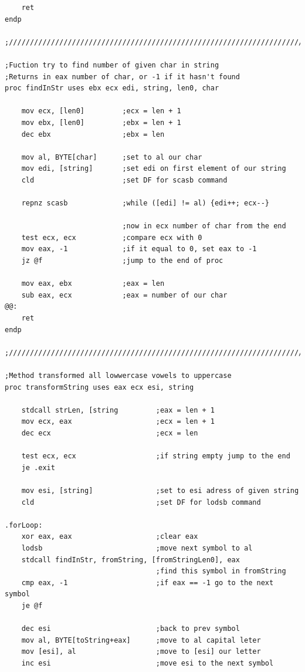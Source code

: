 \documentclass[14pt,a4paper]{article}
\begin{document}
\begin{verbatim}
    ret
endp

;///////////////////////////////////////////////////////////////////////

;Fuction try to find number of given char in string
;Returns in eax number of char, or -1 if it hasn't found
proc findInStr uses ebx ecx edi, string, len0, char

    mov ecx, [len0]         ;ecx = len + 1
    mov ebx, [len0]         ;ebx = len + 1
    dec ebx				    ;ebx = len

    mov al, BYTE[char]      ;set to al our char
    mov edi, [string]       ;set edi on first element of our string
    cld                     ;set DF for scasb command

    repnz scasb             ;while ([edi] != al) {edi++; ecx--}

                            ;now in ecx number of char from the end
    test ecx, ecx           ;compare ecx with 0			
    mov eax, -1             ;if it equal to 0, set eax to -1  
    jz @f                   ;jump to the end of proc

    mov eax, ebx            ;eax = len
    sub eax, ecx            ;eax = number of our char
@@:
    ret
endp

;///////////////////////////////////////////////////////////////////////

;Method transformed all lowwercase vowels to uppercase
proc transformString uses eax ecx esi, string

    stdcall strLen, [string         ;eax = len + 1
    mov ecx, eax                    ;ecx = len + 1
    dec ecx                         ;ecx = len

    test ecx, ecx                   ;if string empty jump to the end
    je .exit	

    mov esi, [string]               ;set to esi adress of given string
    cld                             ;set DF for lodsb command
	
.forLoop:	
    xor eax, eax                    ;clear eax	
    lodsb                           ;move next symbol to al 
    stdcall findInStr, fromString, [fromStringLen0], eax
                                    ;find this symbol in fromString
    cmp eax, -1                     ;if eax == -1 go to the next symbol
    je @f

    dec esi                         ;back to prev symbol
    mov al, BYTE[toString+eax]      ;move to al capital leter
    mov [esi], al                   ;move to [esi] our letter
    inc esi                         ;move esi to the next symbol


\end{verbatim}
\end{document}
